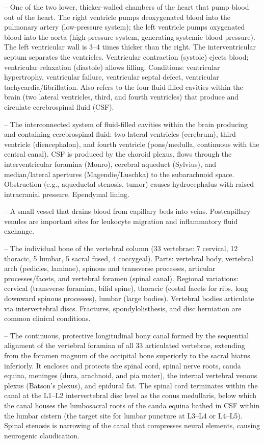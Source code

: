 -- One of the two lower, thicker-walled chambers of the heart that pump blood out of the heart. The right ventricle pumps deoxygenated blood into the pulmonary artery (low-pressure system); the left ventricle pumps oxygenated blood into the aorta (high-pressure system, generating systemic blood pressure). The left ventricular wall is 3--4 times thicker than the right. The interventricular septum separates the ventricles. Ventricular contraction (systole) ejects blood; ventricular relaxation (diastole) allows filling. Conditions: ventricular hypertrophy, ventricular failure, ventricular septal defect, ventricular tachycardia/fibrillation. Also refers to the four fluid-filled cavities within the brain (two lateral ventricles, third, and fourth ventricles) that produce and circulate cerebrospinal fluid (CSF).

-- The interconnected system of fluid-filled cavities within the brain producing and containing cerebrospinal fluid: two lateral ventricles (cerebrum), third ventricle (diencephalon), and fourth ventricle (pons/medulla, continuous with the central canal). CSF is produced by the choroid plexus, flows through the interventricular foramina (Monro), cerebral aqueduct (Sylvius), and median/lateral apertures (Magendie/Luschka) to the subarachnoid space. Obstruction (e.g., aqueductal stenosis, tumor) causes hydrocephalus with raised intracranial pressure. Ependymal lining.

-- A small vessel that drains blood from capillary beds into veins. Postcapillary venules are important sites for leukocyte migration and inflammatory fluid exchange.

-- The individual bone of the vertebral column (33 vertebrae: 7 cervical, 12 thoracic, 5 lumbar, 5 sacral fused, 4 coccygeal). Parts: vertebral body, vertebral arch (pedicles, laminae), spinous and transverse processes, articular processes/facets, and vertebral foramen (spinal canal). Regional variations: cervical (transverse foramina, bifid spine), thoracic (costal facets for ribs, long downward spinous processes), lumbar (large bodies). Vertebral bodies articulate via intervertebral discs. Fractures, spondylolisthesis, and disc herniation are common clinical conditions.

-- The continuous, protective longitudinal bony canal formed by the sequential alignment of the vertebral foramina of all 33 articulated vertebrae, extending from the foramen magnum of the occipital bone superiorly to the sacral hiatus inferiorly. It encloses and protects the spinal cord, spinal nerve roots, cauda equina, meninges (dura, arachnoid, and pia mater), the internal vertebral venous plexus (Batson's plexus), and epidural fat. The spinal cord terminates within the canal at the L1--L2 intervertebral disc level as the conus medullaris, below which the canal houses the lumbosacral roots of the cauda equina bathed in CSF within the lumbar cistern (the target site for lumbar puncture at L3--L4 or L4--L5). Spinal stenosis is narrowing of the canal that compresses neural elements, causing neurogenic claudication.

